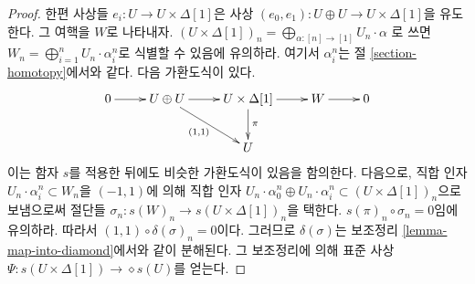 \begin{proof}
\medskip\noindent
한편 사상들 $e_i : U \to U \times \Delta[1]$은 사상
$(e_0, e_1) : U \oplus U \to U \times \Delta[1]$을 유도한다.
그 여핵을 $W$로 나타내자.
$(U \times \Delta[1])_n = \bigoplus_{\alpha : [n] \to [1]} U_n \cdot \alpha$
로 쓰면 $W_n = \bigoplus_{i = 1}^n U_n \cdot \alpha^n_i$로 식별할 수
있음에 유의하라. 여기서 $\alpha^n_i$는 절 \ref{section-homotopy}에서와
같다. 다음 가환도식이 있다.
$$
\xymatrix{
0 \ar[r] &
U \oplus U \ar[rd]_{(1, 1)} \ar[r] &
U \times \Delta[1] \ar[d]^\pi \ar[r] &
W \ar[r] &
0 \\
& & U & &
}
$$
이는 함자 $s$를 적용한 뒤에도 비슷한 가환도식이 있음을 함의한다.
다음으로, 직합 인자 $U_n \cdot \alpha^n_i \subset W_n$을
$(-1, 1)$에 의해 직합 인자
$U_n \cdot \alpha^n_0 \oplus U_n \cdot \alpha^n_i
\subset (U \times \Delta[1])_n$으로 보냄으로써 절단들
$\sigma_n : s(W)_n \to s(U \times \Delta[1])_n$을 택한다.
$s(\pi)_n \circ \sigma_n = 0$임에 유의하라. 따라서
$(1, 1) \circ \delta(\sigma)_n = 0$이다. 그러므로 $\delta(\sigma)$는
보조정리 \ref{lemma-map-into-diamond}에서와 같이 분해된다.
그 보조정리에 의해 표준 사상
$\Psi : s(U \times \Delta[1]) \to \diamond{s(U)}$를 얻는다.


\end{proof}
